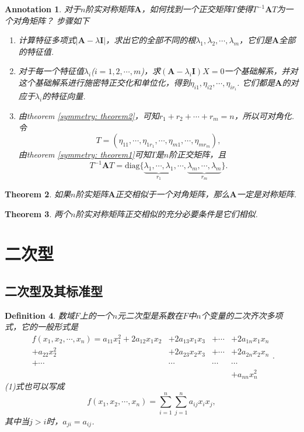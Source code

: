 \documentclass{article}
\newtheorem{theorem}{Theorem}[section]
\newtheorem{definition}[theorem]{Definition}
\newtheorem{annotation}[theorem]{Annotation}
\newcommand{\mbf}[1]{\bm{#1}}
\begin{document}
\begin{annotation}
\rm {\color{red}对于$n$阶实对称矩阵$\mbf{A}$，如何找到一个正交矩阵$T$使得$T^{-1}\mbf{A}T$为一个对角矩阵}？ 步骤如下
\begin{enumerate}
	\item 计算特征多项式$|\mbf{A}-\lambda\mbf{I}|$，求出它的全部不同的根$\lambda_1,\lambda_2,\cdots,\lambda_m$，它们是$\mbf{A}$全部的特征值.
	\item 对于每一个特征值$\lambda_i$($i=1,2,\cdots,m$)，求$(\mbf{A}-\lambda_i\mbf{I})X=0$一个基础解系，并对这个基础解系进行施密特正交化和单位化，得到$\eta_{i1},\eta_{i2},\cdots,\eta_{ir_i}$. 它们都是$\mbf{A}$的对应于$\lambda_i$的特征向量. 
	\item 由theorem \ref{symmetry: theorem2}，可知$r_1 +r_2 +\cdots + r_m = n$，所以可对角化. 令
	$$
	T = (\eta_{11},\cdots,\eta_{1r_1},\cdots,\eta_{m1},\cdots,\eta_{mr_m}),
	$$
	由theorem \ref{symmetry: theorem1}可知$T$是$n$阶正交矩阵，且
	$$
	T^{-1}\mbf{A}T = \text{diag}\{\underbrace{\lambda_1,\cdots,\lambda_1}_{r_1},\cdots,\underbrace{\lambda_m,\cdots,\lambda_m}_{r_m}\}.
	$$
\end{enumerate}
\end{annotation}

\begin{theorem}
\rm 如果$n$阶实矩阵$\mbf{A}$正交相似于一个对角矩阵，那么$\mbf{A}$一定是对称矩阵.
\end{theorem}


\begin{theorem}
\rm 两个$n$阶实对称矩阵正交相似的充分必要条件是它们相似.
\end{theorem}


\newpage
\section{二次型}

\subsection{二次型及其标准型}

\begin{definition}
\rm 数域$F$上的一个$n$元二次型是系数在$F$中$n$个变量的二次齐次多项式，它的一般形式是
\begin{equation}
\begin{array}{rlll}
f(x_1,x_2,\cdots,x_n) = a_{11}x_1^2 + 2a_{12}x_1x_2 &+ 2a_{13}x_1x_3 &+ \cdots &+ 2a_{1n}x_1x_n \\
+a_{22}x_2^{2} &+ 2a_{23}x_2x_3 &+  \cdots &+2a_{2n}x_2x_n\\
+\cdots &\cdots &\cdots &\cdots  \\
&&&+a_{nn}x_n^2
\end{array}.
\end{equation}
(1)式也可以写成
\begin{equation}
f(x_1,x_2,\cdots,x_n) = \sum\limits_{i=1}^n\sum\limits_{j=1}^n a_{ij}x_ix_j,
\end{equation}
其中当$j>i$时，$a_{ji}=a_{ij}$.
\end{definition}
\end{document}

